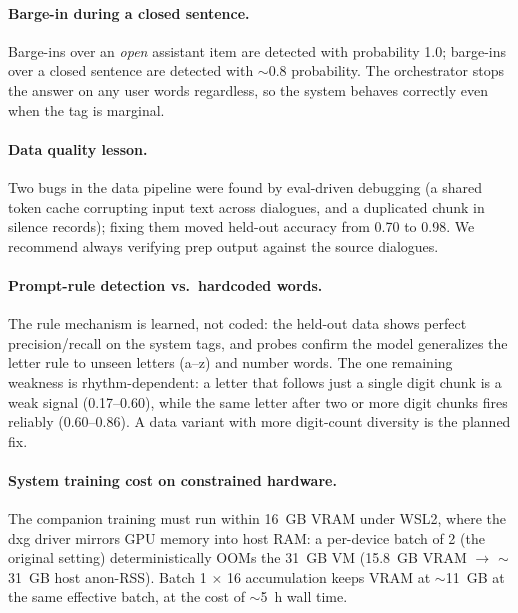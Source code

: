 \documentclass[conference]{IEEEtran}
\begin{document}
\paragraph{Barge-in during a closed sentence.} Barge-ins over an
\emph{open} assistant item are detected with probability 1.0; barge-ins over
a closed sentence are detected with $\sim$0.8 probability. The orchestrator
stops the answer on any user words regardless, so the system behaves
correctly even when the tag is marginal.

\paragraph{Data quality lesson.} Two bugs in the data pipeline were found by
eval-driven debugging (a shared token cache corrupting input text across
dialogues, and a duplicated chunk in silence records); fixing them moved
held-out accuracy from 0.70 to 0.98. We recommend always verifying prep
output against the source dialogues.

\paragraph{Prompt-rule detection vs.\ hardcoded words.} The rule mechanism
is learned, not coded: the held-out data shows perfect precision/recall on
the system tags, and probes confirm the model generalizes the letter rule to
unseen letters (a--z) and number words. The one remaining weakness is
rhythm-dependent: a letter that follows just a single digit chunk is a weak
signal (0.17--0.60), while the same letter after two or more digit chunks
fires reliably (0.60--0.86). A data variant with more digit-count diversity
is the planned fix.

\paragraph{System training cost on constrained hardware.} The companion
training must run within 16~GB VRAM under WSL2, where the dxg driver mirrors
GPU memory into host RAM: a per-device batch of 2 (the original setting)
deterministically OOMs the 31~GB VM (15.8~GB VRAM $\rightarrow$ $\sim$31~GB
host anon-RSS). Batch 1 $\times$ 16 accumulation keeps VRAM at
$\sim$11~GB at the same effective batch, at the cost of $\sim$5~h wall time.
\end{document}
